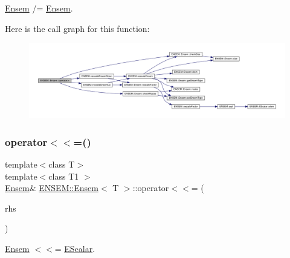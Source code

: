 \mbox{\hyperlink{classENSEM_1_1Ensem}{Ensem}} /= \mbox{\hyperlink{classENSEM_1_1Ensem}{Ensem}}. 

Here is the call graph for this function\+:
\nopagebreak
\begin{figure}[H]
\begin{center}
\leavevmode
\includegraphics[width=350pt]{d7/d3e/classENSEM_1_1Ensem_aa0d7f0d69f4c1c1adc551c91abcf271a_cgraph}
\end{center}
\end{figure}
\mbox{\label{classENSEM_1_1Ensem_a9aecabccdc31d9b43db877a82879f702}} 
\subsubsection{\texorpdfstring{operator$<$$<$=()}{operator<<=()}\hspace{0.1cm}{\footnotesize\ttfamily [1/3]}}
{\footnotesize\ttfamily template$<$class T$>$ \\
template$<$class T1 $>$ \\
\mbox{\hyperlink{classENSEM_1_1Ensem}{Ensem}}\& \mbox{\hyperlink{classENSEM_1_1Ensem}{E\+N\+S\+E\+M\+::\+Ensem}}$<$ T $>$\+::operator$<$$<$= (\begin{DoxyParamCaption}\item[{const \mbox{\hyperlink{classENSEM_1_1EScalar}{E\+Scalar}}$<$ T1 $>$ \&}]{rhs }\end{DoxyParamCaption})\hspace{0.3cm}{\ttfamily [inline]}}



\mbox{\hyperlink{classENSEM_1_1Ensem}{Ensem}} $<$$<$= \mbox{\hyperlink{classENSEM_1_1EScalar}{E\+Scalar}}. 

